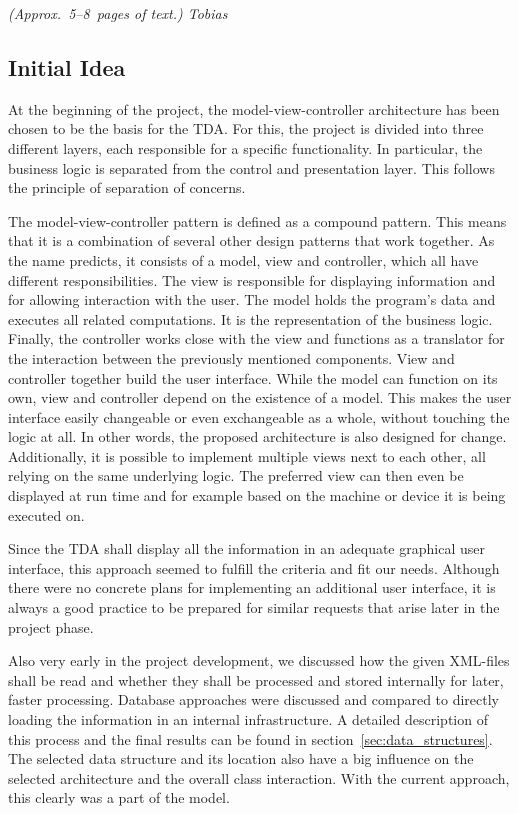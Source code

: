 \emph{(Approx.~5--8~pages of text.) Tobias}

\subsection{Initial Idea}
At the beginning of the project, the model-view-controller architecture has been chosen to be the basis for the TDA. For this, the project is divided into three different layers, each responsible for a specific functionality. In particular, the business logic is separated from the control and presentation layer. This follows the principle of separation of concerns.

The model-view-controller pattern is defined as a compound pattern. This means that it is a combination of several other design patterns that work together. As the name predicts, it consists of a model, view and controller, which all have different responsibilities. The view is responsible for displaying information and for allowing interaction with the user. The model holds the program's data and executes all related computations. It is the representation of the business logic. Finally, the controller works close with the view and functions as a translator for the interaction between the previously mentioned components. View and controller together build the user interface.
While the model can function on its own, view and controller depend on the existence of a model. This makes the user interface easily changeable or even exchangeable as a whole, without touching the logic at all. In other words, the proposed architecture is also designed for change. Additionally, it is possible to implement multiple views next to each other, all relying on the same underlying logic. The preferred view can then even be displayed at run time and for example based on the machine or device it is being executed on.

Since the TDA shall display all the information in an adequate graphical user interface, this approach seemed to fulfill the criteria and fit our needs. Although there were no concrete plans for implementing an additional user interface, it is always a good practice to be prepared for similar requests that arise later in the project phase.

Also very early in the project development, we discussed how the given XML-files shall be read and whether they shall be processed and stored internally for later, faster processing. Database approaches were discussed and compared to directly loading the information in an internal infrastructure. A detailed description of this process and the final results can be found in section~\ref{sec:data_structures}.
The selected data structure and its location also have a big influence on the selected architecture and the overall class interaction. With the current approach, this clearly was a part of the model.

